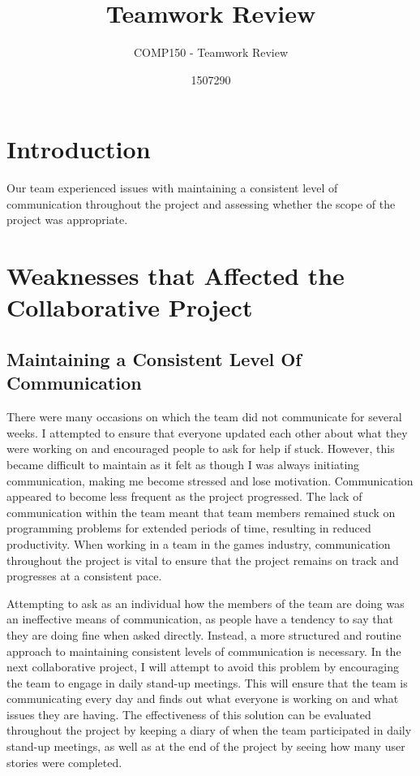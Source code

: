 \documentclass{scrartcl}
\title{Teamwork Review}
\subtitle{COMP150 - Teamwork Review}
\author{1507290}
\begin{document}
\maketitle

\abstract{}

\section{Introduction}
Our team experienced issues with maintaining a consistent level of communication throughout the project and assessing whether the scope of the project was appropriate.

\section{Weaknesses that Affected the Collaborative Project}

\subsection{Maintaining a Consistent Level Of Communication}
There were many occasions on which the team did not communicate for several weeks. I attempted to ensure that everyone updated each other about what they were working on and encouraged people to ask for help if stuck. However, this became difficult to maintain as it felt as though I was always initiating communication, making me become stressed and lose motivation. Communication appeared to become less frequent as the project progressed. The lack of communication within the team meant that team members remained stuck on programming problems for extended periods of time, resulting in reduced productivity. When working in a team in the games industry, communication throughout the project is vital to ensure that the project remains on track and progresses at a consistent pace.

Attempting to ask as an individual how the members of the team are doing was an ineffective means of communication, as people have a tendency to say that they are doing fine when asked directly. Instead, a more structured and routine approach to maintaining consistent levels of communication is necessary. In the next collaborative project, I will attempt to avoid this problem by encouraging the team to engage in daily stand-up meetings. This will ensure that the team is communicating every day and finds out what everyone is working on and what issues they are having. The effectiveness of this solution can be evaluated throughout the project by keeping a diary of when the team participated in daily stand-up meetings, as well as at the end of the project by seeing how many user stories were completed.
\end{document}
